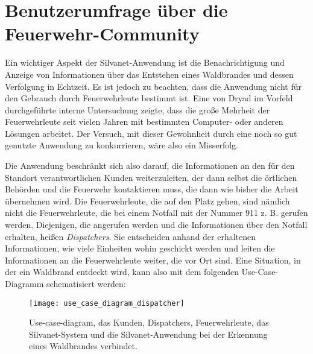 \section{Benutzerumfrage über die Feuerwehr-Community}

Ein wichtiger Aspekt der Silvanet-Anwendung ist die Benachrichtigung und Anzeige von Informationen über das Entstehen eines Waldbrandes und dessen Verfolgung in Echtzeit.
Es ist jedoch zu beachten, dass die Anwendung nicht für den Gebrauch durch Feuerwehrleute bestimmt ist.
Eine von Dryad im Vorfeld durchgeführte interne Untersuchung zeigte, dass die große Mehrheit der Feuerwehrleute seit vielen Jahren mit bestimmten Computer- oder anderen Lösungen arbeitet.
Der Versuch, mit dieser Gewohnheit durch eine noch so gut genutzte Anwendung zu konkurrieren, wäre also ein Misserfolg.

Die Anwendung beschränkt sich also darauf, die Informationen an den für den Standort verantwortlichen Kunden weiterzuleiten, der dann selbst die örtlichen Behörden und die Feuerwehr kontaktieren muss, die dann wie bisher die Arbeit übernehmen wird.
Die Feuerwehrleute, die auf den Platz gehen, sind nämlich nicht die Feuerwehrleute, die bei einem Notfall mit der Nummer 911 z. B. gerufen werden.
Diejenigen, die angerufen werden und die Informationen über den Notfall erhalten, heißen \textit{Dispatchers}.
Sie entscheiden anhand der erhaltenen Informationen, wie viele Einheiten wohin geschickt werden und leiten die Informationen an die Feuerwehrleute weiter, die vor Ort sind.
Eine Situation, in der ein Waldbrand entdeckt wird, kann also mit dem folgenden Use-Case-Diagramm schematisiert werden:

\begin{figure}[H]
  \centering
  \texttt{[image: use\_case\_diagram\_dispatcher]}
  \caption{Use-case-diagram, das Kunden, Dispatchers, Feuerwehrleute, das Silvanet-System und die Silvanet-Anwendung bei der Erkennung eines Waldbrandes verbindet.}
  \label{fig:use_case_diagram_dispatcher}
\end{figure}
